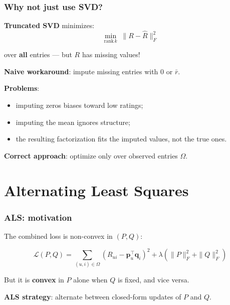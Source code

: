 \documentclass[]{beamer}
\begin{document}
\begin{frame}[fragile]
\frametitle{Why not just use SVD?}
\textbf{Truncated SVD} minimizes:
\begin{equation*}
\min_{\mathrm{rank}\,k}\; \|R - \hat{R}\|_F^2
\end{equation*}

over \textbf{all} entries --- but $R$ has missing values!

\textbf{Naive workaround}: impute missing entries with 0 or $\bar{r}$.

\textbf{Problems}:
\begin{itemize}
  \item imputing zeros biases toward low ratings;
  \item imputing the mean ignores structure;
  \item the resulting factorization fits the imputed values, not the true ones.
\end{itemize}

\textbf{Correct approach}: optimize only over observed entries $\Omega$.

\end{frame}

\section{Alternating Least Squares}

\begin{frame}[fragile]
\frametitle{ALS: motivation}
The combined loss is non-convex in $(P, Q)$:

\begin{equation*}
\mathcal{L}(P, Q) = \sum_{(u,i)\in\Omega}(R_{ui} - \mathbf{p}_u^\top \mathbf{q}_i)^2
  + \lambda\!\left(\|P\|_F^2 + \|Q\|_F^2\right)
\end{equation*}

But it is \textbf{convex} in $P$ alone when $Q$ is fixed, and vice versa.

\textbf{ALS strategy}: alternate between closed-form updates of $P$ and $Q$.

\end{frame}
\end{document}
